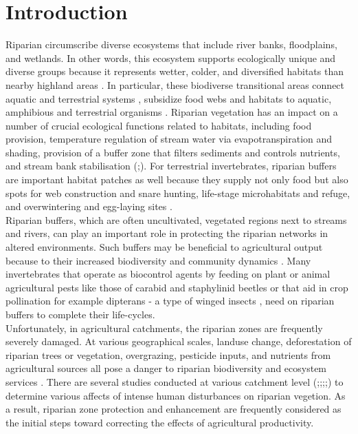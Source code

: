\documentclass[12pt]{article}
\numberwithin{equation}{section}
\begin{document}
\section{Introduction}
Riparian circumscribe diverse ecosystems that include river banks, floodplains, and wetlands. In other words, this ecosystem supports ecologically unique and diverse groups because it represents wetter, colder, and diversified habitats than nearby highland areas \cite{pettit2007fire}. In particular, these biodiverse transitional areas connect aquatic and terrestrial systems \cite{popescu2021riparian}, subsidize food webs and habitats to aquatic, amphibious and terrestrial organisms \cite{capron2020}. Riparian vegetation has an impact on a number of crucial ecological functions related to habitats, including food provision, temperature regulation of stream water via evapotranspiration and shading, provision of a buffer zone that filters sediments and controls nutrients, and stream bank stabilisation (\cite{hood2000};\cite{richardson2007}). For terrestrial invertebrates, riparian buffers are important habitat patches as well because they supply not only food but also spots for web construction and snare hunting, life-stage microhabitats and refuge, and overwintering and egg-laying sites \cite{popescu2021riparian}.\\ 
Riparian buffers, which are often uncultivated, vegetated regions next to streams and rivers, can play an important role in protecting the riparian networks in altered environments\cite{burdon2020assessing}. Such buffers may be beneficial to agricultural output because to their increased biodiversity and community dynamics \cite{forio2020small}. Many invertebrates that operate as biocontrol agents by feeding on plant or animal agricultural pests like those of carabid and staphylinid beetles \cite{andersen2000long} or that aid in crop pollination for example dipterans - a type of winged insects \cite{ssymank2008pollinating}, need on riparian buffers to complete their life-cycles.\\
Unfortunately, in agricultural catchments, the riparian zones are frequently severely damaged. At various geographical scales, landuse change, deforestation of riparian trees or vegetation, overgrazing, pesticide inputs, and nutrients from agricultural sources all pose a danger to riparian biodiversity and ecosystem services \cite{burdon2013habitat}. There are several studies conducted at various catchment level (\cite{cesarini2022riparian};\cite{alemu2018identifying};\cite{heartsill2003riparian};\cite{corbacho2003patterns};\cite{schlosser1981riparian}) to determine various affects of intense human disturbances on riparian vegetion. As a result, riparian zone protection and enhancement are frequently considered as the initial steps toward correcting the effects of agricultural productivity.\\
\end{document}
